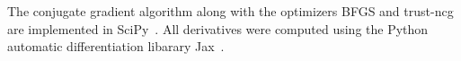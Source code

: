 The conjugate gradient algorithm along with the optimizers BFGS and trust-ncg
are implemented in SciPy~\citep{scipy}.
All derivatives were computed using the Python
automatic differentiation libarary Jax~\citep{jax2018github}.

